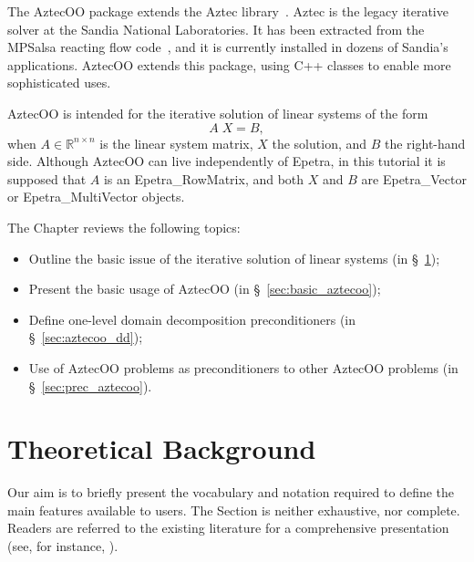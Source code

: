 \begin{introchapter}
The AztecOO \cite{AztecOO-Users-Guide} package extends the Aztec library~\cite{Aztec2.1}.
Aztec is the legacy iterative solver at the Sandia National
Laboratories.  It has been extracted from the MPSalsa reacting flow
code~\cite{MPSalsa-Theory,MPSalsa-User-Guide}, and it is currently
installed in dozens of Sandia's applications. AztecOO extends this
package, using C++ classes to enable more sophisticated uses.

AztecOO is intended for the iterative solution of linear systems of the form
\begin{equation}
  \label{eq:linear_sys}
  A \; X = B ,
\end{equation}
when $A \in \mathbb{R}^{n \times n}$ is the linear system matrix, $X$
the solution, and $B$ the right-hand side. Although AztecOO can live
independently of Epetra, in this tutorial it is supposed that $A$ is an
Epetra\_RowMatrix, and both $X$ and $B$ are Epetra\_Vector or
Epetra\_MultiVector objects.

The Chapter reviews the following topics:
\begin{itemize}
\item Outline the basic issue of the iterative solution of linear
  systems (in \S~\ref{aztecoo:theoretical});
\item Present the basic usage of AztecOO (in
  \S~\ref{sec:basic_aztecoo});
\item Define one-level domain decomposition preconditioners (in
  \S~\ref{sec:aztecoo_dd});
\item Use of AztecOO problems as preconditioners to other AztecOO
  problems (in \S~\ref{sec:prec_aztecoo}).
\end{itemize}
\end{introchapter}


\section{Theoretical Background}
\label{aztecoo:theoretical}

Our aim is to briefly present the vocabulary and notation 
required to define the main features available to users.
The Section is neither exhaustive, nor complete. Readers are
referred to the existing literature for a comprehensive presentation (see,
for instance, \cite{temp94,axelsson94iterative,saad96iterative}).

\medskip

